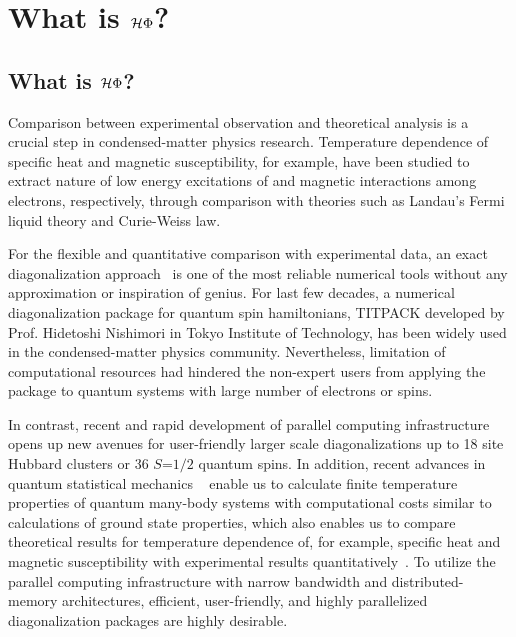 \chapter{What is ${\mathcal{H} \Phi}$?}
\label{Ch:whatishphi}
\section{What is $\mathcal{H} \Phi$?}
Comparison between experimental observation and theoretical analysis is a crucial step
in condensed-matter physics research. Temperature dependence of specific heat and
magnetic susceptibility, for example, have been studied to extract nature of low energy
excitations of and magnetic interactions among electrons, respectively, through comparison
with theories such as Landau's Fermi liquid theory and Curie-Weiss law.

For the flexible and quantitative comparison with experimental data, an exact diagonalization
approach~\cite{Dagotto} is one of the most reliable numerical tools without any approximation or
inspiration of genius. For last few decades, a numerical diagonalization package for quantum
spin hamiltonians, TITPACK developed by Prof. Hidetoshi Nishimori in Tokyo Institute of Technology,
has been widely used in the condensed-matter physics community. Nevertheless, limitation of
computational resources had hindered the non-expert users from applying the package to
quantum systems with large number of electrons or spins.

In contrast, recent and rapid development of parallel computing infrastructure opens up new
avenues for user-friendly larger scale diagonalizations up to 18 site Hubbard clusters
or 36 $S$=$1/2$ quantum spins. In addition, recent advances in quantum statistical mechanics ~\cite{Imada1986,FTLanczos,Hams,Sugiura2012}
enable us to calculate finite temperature properties of quantum many-body systems
with computational costs similar to calculations of ground state properties,
which also enables us to compare theoretical results for temperature dependence
of, for example, specific heat and magnetic susceptibility with experimental results quantitatively~\cite{Yamaji2014}.
To utilize the parallel computing infrastructure with narrow bandwidth and distributed-memory
architectures, efficient, user-friendly, and highly parallelized diagonalization packages are highly desirable.

